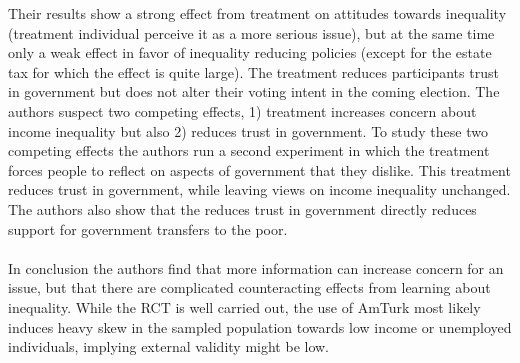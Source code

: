 Their results show a strong effect from treatment on attitudes towards inequality (treatment individual perceive it as a more serious issue), but at the same time only a weak effect in favor of inequality reducing policies (except for the estate tax for which the effect is quite large). The treatment reduces participants trust in government but does not alter their voting intent in the coming election. The authors suspect two competing effects, 1) treatment increases concern about income inequality but also 2) reduces trust in government. To study these two competing effects the authors run a second experiment in which the treatment forces people to reflect on aspects of government that they dislike. This treatment reduces trust in government, while leaving views on income inequality unchanged. The authors also show that the reduces trust in government directly reduces support for government transfers to the poor. 
\\ \\ 
In conclusion the authors find that more information can increase concern for an issue, but that there are complicated counteracting effects from learning about inequality. While the RCT is well carried out, the use of AmTurk most likely induces heavy skew in the sampled population towards low income or unemployed individuals, implying external validity might be low.


